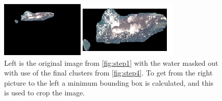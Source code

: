 \begin{figure}[H]
\centering
\includegraphics{Images/preprocess5}
\caption{Left is the original image from \ref{fig:step1} with the water masked out with use of the final clusters from \ref{fig:step4}. To get from the right picture to the left a minimum bounding box is calculated, and this is used to crop the image.}
\label{fig:step5}
\end{figure}

